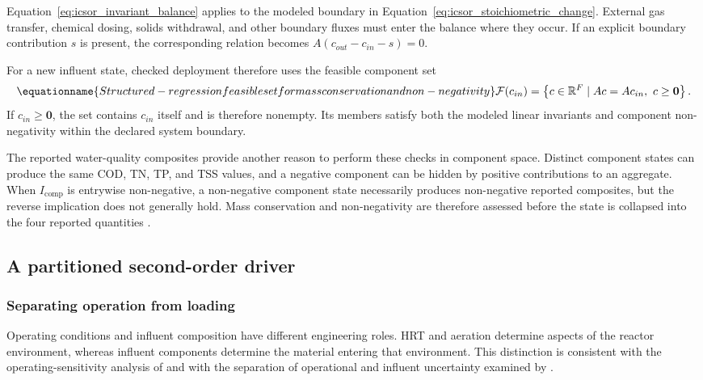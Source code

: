 Equation~\eqref{eq:icsor_invariant_balance} applies to the modeled boundary in Equation~\eqref{eq:icsor_stoichiometric_change}. External gas transfer, chemical dosing, solids withdrawal, and other boundary fluxes must enter the balance where they occur. If an explicit boundary contribution \(s\) is present, the corresponding relation becomes \(A(c_{out}-c_{in}-s)=0\).

For a new influent state, checked deployment therefore uses the feasible component set
\begin{equation}
\equationname{Structured-regression feasible set for mass conservation and non-negativity}
\label{eq:icsor_feasible_set}
\mathcal{F}(c_{in})=
\left\{c\in\mathbb{R}^{F}\mid Ac=Ac_{in},\ c\geq\mathbf{0}\right\}.
\end{equation}
If \(c_{in}\geq\mathbf{0}\), the set contains \(c_{in}\) itself and is therefore nonempty. Its members satisfy both the modeled linear invariants and component non-negativity within the declared system boundary.

The reported water-quality composites provide another reason to perform these checks in component space. Distinct component states can produce the same COD, TN, TP, and TSS values, and a negative component can be hidden by positive contributions to an aggregate. When \(I_{\mathrm{comp}}\) is entrywise non-negative, a non-negative component state necessarily produces non-negative reported composites, but the reverse implication does not generally hold. Mass conservation and non-negativity are therefore assessed before the state is collapsed into the four reported quantities \citep{Henze2006,Selerio2026}.

\subsection{A partitioned second-order driver}

\subsubsection{Separating operation from loading}

Operating conditions and influent composition have different engineering roles. HRT and aeration determine aspects of the reactor environment, whereas influent components determine the material entering that environment. This distinction is consistent with the operating-sensitivity analysis of \citet{Araujo2013} and with the separation of operational and influent uncertainty examined by \citet{Machado2014}.

